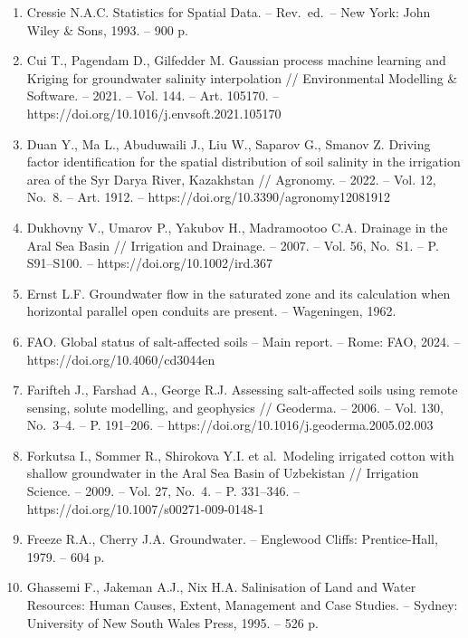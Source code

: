 \documentclass[14pt,a4paper,oneside]{extreport}
\begin{document}
\begin{enumerate}
  Corwin D.L., Scudiero E. Review of soil salinity assessment for
  agriculture across multiple scales using proximal and/or remote
  sensors // Advances in Agronomy. -- 2019. -- Vol. 158. -- P. 1--130.
  -- https://doi.org/10.1016/bs.agron.2019.07.001
\item
  Cressie N.A.C. Statistics for Spatial Data. -- Rev.~ed.~-- New York:
  John Wiley \& Sons, 1993. -- 900 p.
\item
  Cui T., Pagendam D., Gilfedder M. Gaussian process machine learning
  and Kriging for groundwater salinity interpolation // Environmental
  Modelling \& Software. -- 2021. -- Vol. 144. -- Art. 105170. --
  https://doi.org/10.1016/j.envsoft.2021.105170
\item
  Duan Y., Ma L., Abuduwaili J., Liu W., Saparov G., Smanov Z. Driving
  factor identification for the spatial distribution of soil salinity in
  the irrigation area of the Syr Darya River, Kazakhstan // Agronomy. --
  2022. -- Vol. 12, No.~8. -- Art. 1912. --
  https://doi.org/10.3390/agronomy12081912
\item
  Dukhovny V., Umarov P., Yakubov H., Madramootoo C.A. Drainage in the
  Aral Sea Basin // Irrigation and Drainage. -- 2007. -- Vol. 56,
  No.~S1. -- P. S91--S100. -- https://doi.org/10.1002/ird.367
\item
  Ernst L.F. Groundwater flow in the saturated zone and its calculation
  when horizontal parallel open conduits are present. -- Wageningen,
  1962.
\item
  FAO. Global status of salt-affected soils -- Main report. -- Rome:
  FAO, 2024. -- https://doi.org/10.4060/cd3044en
\item
  Farifteh J., Farshad A., George R.J. Assessing salt-affected soils
  using remote sensing, solute modelling, and geophysics // Geoderma. --
  2006. -- Vol. 130, No.~3--4. -- P. 191--206. --
  https://doi.org/10.1016/j.geoderma.2005.02.003
\item
  Forkutsa I., Sommer R., Shirokova Y.I. et al.~Modeling irrigated
  cotton with shallow groundwater in the Aral Sea Basin of Uzbekistan //
  Irrigation Science. -- 2009. -- Vol. 27, No.~4. -- P. 331--346. --
  https://doi.org/10.1007/s00271-009-0148-1
\item
  Freeze R.A., Cherry J.A. Groundwater. -- Englewood Cliffs:
  Prentice-Hall, 1979. -- 604 p.
\item
  Ghassemi F., Jakeman A.J., Nix H.A. Salinisation of Land and Water
  Resources: Human Causes, Extent, Management and Case Studies. --
  Sydney: University of New South Wales Press, 1995. -- 526 p.

\end{enumerate}
\end{document}
